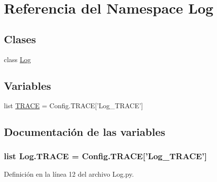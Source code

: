 \hypertarget{namespace_log}{\section{Referencia del Namespace Log}
\label{namespace_log}
}
\subsection*{Clases}
\begin{DoxyCompactItemize}
\item 
class \hyperlink{class_log_1_1_log}{Log}
\end{DoxyCompactItemize}
\subsection*{Variables}
\begin{DoxyCompactItemize}
\item 
list \hyperlink{namespace_log_ae8f55475ed5df129255d987cde8c6b07}{T\-R\-A\-C\-E} = Config.\-T\-R\-A\-C\-E\mbox{[}'Log\-\_\-\-T\-R\-A\-C\-E'\mbox{]}
\end{DoxyCompactItemize}


\subsection{Documentación de las variables}
\hypertarget{namespace_log_ae8f55475ed5df129255d987cde8c6b07}{
\subsubsection[{T\-R\-A\-C\-E}]{\setlength{\rightskip}{0pt plus 5cm}list Log.\-T\-R\-A\-C\-E = Config.\-T\-R\-A\-C\-E\mbox{[}'Log\-\_\-\-T\-R\-A\-C\-E'\mbox{]}}}\label{namespace_log_ae8f55475ed5df129255d987cde8c6b07}


Definición en la línea 12 del archivo Log.\-py.

